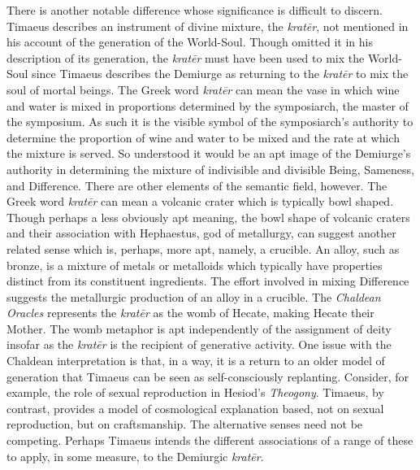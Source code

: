There is another notable difference whose significance is difficult to discern. Timae\-us describes an instrument of divine mixture, the \emph{kratēr}, not mentioned in his account of the generation of the World-Soul. Though omitted it in his description of its generation, the \emph{kratēr} must have been used to mix the World-Soul since Timaeus describes the Demiurge as returning to the \emph{kratēr} to mix the soul of mortal beings. The Greek word \emph{kratēr} can mean the vase in which wine and water is mixed in proportions determined by the symposiarch, the master of the symposium. As such it is the visible symbol of the symposiarch's authority to determine the proportion of wine and water to be mixed and the rate at which the mixture is served. So understood it would be an apt image of the Demiurge's authority in determining the mixture of indivisible and divisible Being, Sameness, and Difference. There are other elements of the semantic field, however. The Greek word \emph{kratēr} can mean a volcanic crater which is typically bowl shaped. Though perhaps a less obviously apt meaning, the bowl shape of volcanic craters and their association with Hephaestus, god of metallurgy, can suggest another related sense which is, perhaps, more apt, namely, a crucible. An alloy, such as bronze, is a mixture of metals or metalloids which typically have properties distinct from its constituent ingredients. The effort involved in mixing Difference suggests the metallurgic production of an alloy in a crucible. The \emph{Chaldean Oracles} represents the \emph{kratēr} as the womb of Hecate, making Hecate their Mother. The womb metaphor is apt independently of the assignment of deity insofar as the \emph{kratēr} is the recipient of generative activity. One issue with the Chaldean interpretation is that, in a way, it is a return to an older model of generation that Timaeus can be seen as self-consciously replanting. Consider, for example, the role of sexual reproduction in Hesiod's \emph{Theogony}. Timaeus, by contrast, provides a model of cosmological explanation based, not on sexual reproduction, but on craftsmanship. The alternative senses need not be competing. Perhaps Timaeus intends the different associations of a range of these to apply, in some measure, to the Demiurgic \emph{kratēr}.

